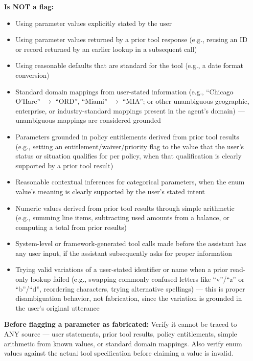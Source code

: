 \begin{tcolorbox}[promptbox, title={\small Faithfulness Prompt}]
      \textbf{Is NOT a flag:}
      \begin{itemize}
        \item Using parameter values explicitly stated by the user
        \item Using parameter values returned by a prior tool response (e.g., reusing an ID or record returned by an earlier lookup in a subsequent call)
        \item Using reasonable defaults that are standard for the tool (e.g., a date format conversion)
        \item Standard domain mappings from user-stated information (e.g., ``Chicago O'Hare'' $\rightarrow$ ``ORD'', ``Miami'' $\rightarrow$ ``MIA''; or other unambiguous geographic, enterprise, or industry-standard mappings present in the agent's domain) --- unambiguous mappings are considered grounded
        \item Parameters grounded in policy entitlements derived from prior tool results (e.g., setting an entitlement/waiver/priority flag to the value that the user's status or situation qualifies for per policy, when that qualification is clearly supported by a prior tool result)
        \item Reasonable contextual inferences for categorical parameters, when the enum value's meaning is clearly supported by the user's stated intent
        \item Numeric values derived from prior tool results through simple arithmetic (e.g., summing line items, subtracting used amounts from a balance, or computing a total from prior results)
        \item System-level or framework-generated tool calls made before the assistant has any user input, if the assistant subsequently asks for proper information
        \item Trying valid variations of a user-stated identifier or name when a prior read-only lookup failed (e.g., swapping commonly confused letters like ``v''/``z'' or ``b''/``d'', reordering characters, trying alternative spellings) --- this is proper disambiguation behavior, not fabrication, since the variation is grounded in the user's original utterance
      \end{itemize}

      \textbf{Before flagging a parameter as fabricated:} Verify it cannot be traced to ANY source --- user statements, prior tool results, policy entitlements, simple arithmetic from known values, or standard domain mappings. Also verify enum values against the actual tool specification before claiming a value is invalid.\newline


\end{tcolorbox}
